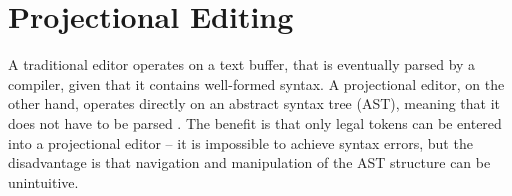 

\section{Projectional Editing}
 A traditional editor operates on a text buffer, that is eventually parsed by a compiler, given that it contains well-formed syntax. A projectional editor, on the other hand, operates directly on an abstract syntax tree (AST), meaning that it does not have to be parsed \cite{voelter2014towards}. The benefit is that only legal tokens can be entered into a projectional editor -- it is impossible to achieve syntax errors, but the disadvantage is that navigation and manipulation of the AST structure can be unintuitive.

